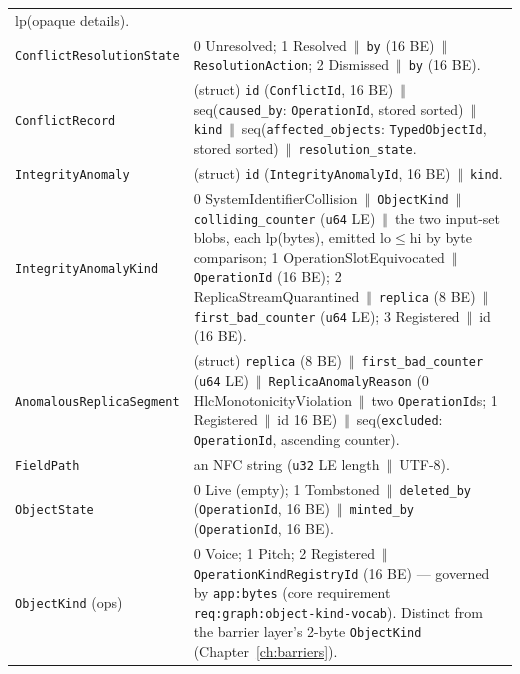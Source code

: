 \documentclass[11pt,letterpaper]{report}
\newcommand{\tablenums}[1]{{\addfontfeatures{Numbers={Lining,Tabular}}#1}}
\newcounter{requirement}[chapter]
\newcommand{\cat}{\ensuremath{\,\Vert\,}}
\begin{document}
\begin{longtable}{>{\raggedright\arraybackslash}p{1.6in} p{4.1in}}
    $\mathrm{lp}$(opaque details). \\
  \texttt{ConflictResolutionState} &
    \tablenums{0} Unresolved; \tablenums{1} Resolved \cat{} \texttt{by}
    (16 BE) \cat{} \texttt{ResolutionAction}; \tablenums{2} Dismissed \cat{}
    \texttt{by} (16 BE). \\
  \texttt{ConflictRecord} &
    (struct) \texttt{id} (\texttt{ConflictId}, 16 BE) \cat{}
    seq(\texttt{caused\_by}: \texttt{OperationId}, stored sorted) \cat{}
    \texttt{kind} \cat{} seq(\texttt{affected\_objects}:
    \texttt{TypedObjectId}, stored sorted) \cat{}
    \texttt{resolution\_state}. \\
  \texttt{IntegrityAnomaly} &
    (struct) \texttt{id} (\texttt{IntegrityAnomalyId}, 16 BE) \cat{}
    \texttt{kind}. \\
  \texttt{IntegrityAnomalyKind} &
    \tablenums{0} SystemIdentifierCollision \cat{} \texttt{ObjectKind}
    \cat{} \texttt{colliding\_counter} (\texttt{u64} LE) \cat{} the two
    input-set blobs, each $\mathrm{lp}$(bytes), emitted lo${}\leq{}$hi by
    byte comparison;
    \tablenums{1} OperationSlotEquivocated \cat{} \texttt{OperationId}
    (16 BE);
    \tablenums{2} ReplicaStreamQuarantined \cat{} \texttt{replica} (8 BE)
    \cat{} \texttt{first\_bad\_counter} (\texttt{u64} LE);
    \tablenums{3} Registered \cat{} id (16 BE). \\
  \texttt{AnomalousReplicaSegment} &
    (struct) \texttt{replica} (8 BE) \cat{} \texttt{first\_bad\_counter}
    (\texttt{u64} LE) \cat{} \texttt{ReplicaAnomalyReason}
    (\tablenums{0} HlcMonotonicityViolation \cat{} two
    \texttt{OperationId}s; \tablenums{1} Registered \cat{} id 16 BE)
    \cat{} seq(\texttt{excluded}: \texttt{OperationId}, ascending counter). \\
  \texttt{FieldPath} &
    an NFC string (\texttt{u32} LE length \cat{} UTF-8). \\
  \texttt{ObjectState} &
    \tablenums{0} Live (empty); \tablenums{1} Tombstoned \cat{}
    \texttt{deleted\_by} (\texttt{OperationId}, 16 BE) \cat{}
    \texttt{minted\_by} (\texttt{OperationId}, 16 BE). \\
  \texttt{ObjectKind} (ops) &
    \tablenums{0} Voice; \tablenums{1} Pitch; \tablenums{2} Registered
    \cat{} \texttt{OperationKindRegistryId} (16 BE) --- governed by
    \texttt{app:bytes} (core requirement
    \texttt{req:graph:object-kind-vocab}). Distinct from the barrier layer's
    2-byte \texttt{ObjectKind} (Chapter~\ref{ch:barriers}). \\
  \bottomrule
\end{longtable}
\endgroup
\end{document}
